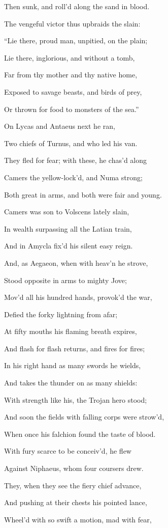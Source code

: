 Then sunk, and roll’d along the sand in blood.

The vengeful victor thus upbraids the slain:

“Lie there, proud man, unpitied, on the plain;

Lie there, inglorious, and without a tomb,

Far from thy mother and thy native home,

Exposed to savage beasts, and birds of prey,

Or thrown for food to monsters of the sea.”

On Lycas and Antaeus next he ran,

Two chiefs of Turnus, and who led his van.

They fled for fear; with these, he chas’d along

Camers the yellow-lock’d, and Numa strong;

Both great in arms, and both were fair and young.

Camers was son to Volscens lately slain,

In wealth surpassing all the Latian train,

And in Amycla fix’d his silent easy reign.

And, as Aegaeon, when with heav’n he strove,

Stood opposite in arms to mighty Jove;

Mov’d all his hundred hands, provok’d the war,

Defied the forky lightning from afar;

At fifty mouths his flaming breath expires,

And flash for flash returns, and fires for fires;

In his right hand as many swords he wields,

And takes the thunder on as many shields:

With strength like his, the Trojan hero stood;

And soon the fields with falling corps were strow’d,

When once his falchion found the taste of blood.

With fury scarce to be conceiv’d, he flew

Against Niphaeus, whom four coursers drew.

They, when they see the fiery chief advance,

And pushing at their chests his pointed lance,

Wheel’d with so swift a motion, mad with fear,

